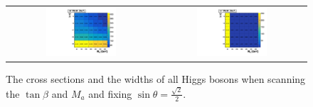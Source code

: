 \begin{figure}[htb]
\begin{tabular}{cc}
\includegraphics[width=0.49\textwidth]{2HDM/varytanbeta/sinp_0p7071/MH750_MA500_MDM1/2HDMPZ2_h2width_varytanb_sinp0p7071.pdf} &
\includegraphics[width=0.49\textwidth]{2HDM/varytanbeta/sinp_0p7071/MH750_MA500_MDM1/2HDMPZ2_h1width_varytanb_sinp0p7071.pdf} \\
 \end{tabular}

  \caption{The cross sections and the widths of all Higgs bosons when scanning the $\tan\beta$ and $M_a$ and fixing 
 $\sin\theta=\frac{\sqrt{2}}{2}$.}
  \label{fig:scantbwidthtwo}
\end{figure}

